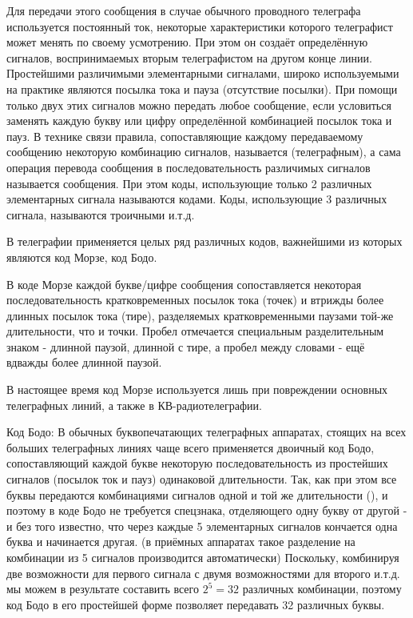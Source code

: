 ﻿\documentclass[a4paper,12pt]{report}
\begin{document}
	Для передачи этого сообщения в случае обычного проводного телеграфа используется постоянный ток, некоторые характеристики которого телеграфист может менять по своему усмотрению. При этом он создаёт определённую  сигналов, воспринимаемых вторым телеграфистом на другом конце линии. Простейшими различимыми элементарными сигналами, широко используемыми на практике являются посылка тока и пауза (отсутствие посылки). При помощи только двух этих сигналов можно передать любое сообщение, если условиться заменять каждую букву или цифру определённой комбинацией посылок тока и пауз. В технике связи правила, сопоставляющие каждому передаваемому сообщению  некоторую комбинацию сигналов, называется  (телеграфным), а сама операция перевода сообщения в последовательность различимых сигналов называется  сообщения. При этом коды, использующие только 2 различных элементарных сигнала называются  кодами. Коды, использующие 3 различных сигнала, называются троичными и.т.д.
	
	В телеграфии применяется целых ряд различных кодов, важнейшими из которых являются код Морзе, код Бодо.
	
	В коде Морзе каждой букве/цифре сообщения сопоставляется некоторая последовательность кратковременных посылок тока (точек) и втрижды более длинных посылок тока (тире), разделяемых кратковременными паузами той-же длительности, что и точки. Пробел отмечается специальным разделительным знаком - длинной паузой, длинной с тире, а пробел между словами - ещё вдважды более длинной паузой. 
	
	В настоящее время код Морзе используется лишь при повреждении основных телеграфных линий, а также в КВ-радиотелеграфии.
	
	Код Бодо: В обычных буквопечатающих телеграфных аппаратах, стоящих на всех больших телеграфных линиях чаще всего применяется двоичный код Бодо, сопоставляющий каждой букве некоторую последовательность из  простейших сигналов (посылок ток и пауз) одинаковой длительности. Так, как при этом все буквы передаются комбинациями сигналов одной и той же длительности (), и поэтому в коде Бодо не требуется спецзнака, отделяющего одну букву от другой - и без того известно, что через каждые 5 элементарных сигналов кончается одна буква и начинается другая. (в приёмных аппаратах такое разделение на комбинации из 5 сигналов производится автоматически) Поскольку, комбинируя две возможности для первого сигнала с двумя возможностями для второго и.т.д. мы можем в результате составить всего $2^5 = 32$ различных комбинации, поэтому код Бодо в его простейшей форме позволяет передавать 32 различных буквы.
	
\end{document}
